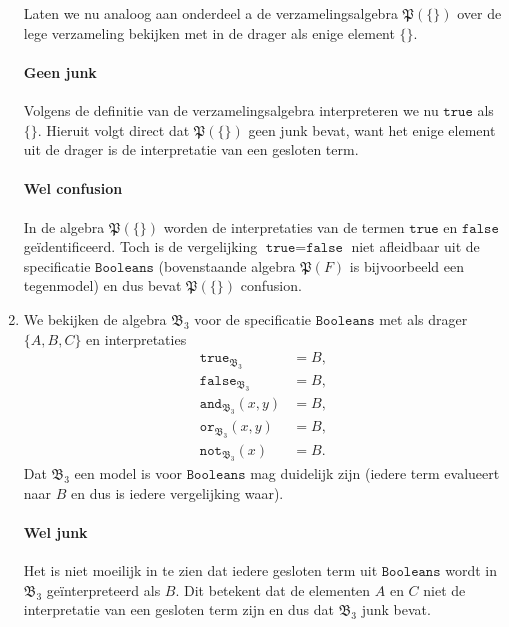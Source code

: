 \documentclass[a4paper,11pt]{article}
\begin{document}
\begin{enumerate}
Laten we nu analoog aan onderdeel a de verzamelingsalgebra
$\mathfrak{P}(\{\})$ over de lege verzameling bekijken met in de drager als
enige element $\{\}$.

\paragraph{Geen junk}

Volgens de definitie van de verzamelingsalgebra interpreteren we nu
$\texttt{true}$ als $\{\}$. Hieruit volgt direct dat $\mathfrak{P}(\{\})$ geen
junk bevat, want het enige element uit de drager is de interpretatie van een
gesloten term.

\paragraph{Wel confusion}

In de algebra $\mathfrak{P}(\{\})$ worden de interpretaties van de termen
$\texttt{true}$ en $\texttt{false}$ ge\"identificeerd. Toch is de vergelijking
$\texttt{true} = \texttt{false}$ niet afleidbaar uit de specificatie
$\texttt{Booleans}$ (bovenstaande algebra $\mathfrak{P}(F)$ is bijvoorbeeld
een tegenmodel) en dus bevat $\mathfrak{P}(\{\})$ confusion.\\[2em]

\item %

We bekijken de algebra $\mathfrak{B}_{3}$ voor de specificatie
$\texttt{Booleans}$ met als drager $\{A,B,C\}$ en interpretaties
\begin{align*}
\texttt{true}_{\mathfrak{B}_{3}}     &= B, \\
\texttt{false}_{\mathfrak{B}_{3}}    &= B, \\
\texttt{and}_{\mathfrak{B}_{3}}(x,y) &= B, \\
\texttt{or}_{\mathfrak{B}_{3}}(x,y)  &= B, \\
\texttt{not}_{\mathfrak{B}_{3}}(x)   &= B.
\end{align*}
Dat $\mathfrak{B}_{3}$ een model is voor $\texttt{Booleans}$ mag duidelijk
zijn (iedere term evalueert naar $B$ en dus is iedere vergelijking waar).

\paragraph{Wel junk}

Het is niet moeilijk in te zien dat iedere gesloten term uit
$\texttt{Booleans}$ wordt in $\mathfrak{B}_{3}$ ge\"interpreteerd als $B$. Dit
betekent dat de elementen $A$ en $C$ niet de interpretatie van een gesloten
term zijn en dus dat $\mathfrak{B}_{3}$ junk bevat.


\end{enumerate}
\end{document}
